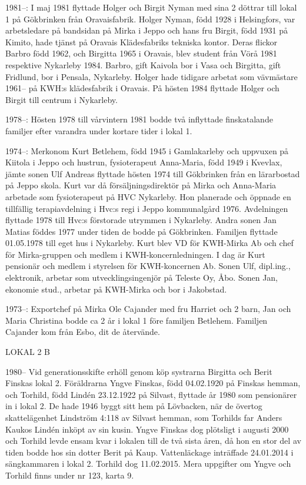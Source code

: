 1981--: I maj 1981 flyttade Holger och Birgit Nyman med sina 2 döttrar till lokal 1 på Gökbrinken från Oravaisfabrik. Holger Nyman, född 1928 i Helsingfors, var arbetsledare på bandsidan på Mirka i Jeppo och hans fru Birgit, född 1931 på Kimito, hade tjänst på Oravais Klädesfabriks tekniska kontor. Deras flickor Barbro född 1962, och Birgitta 1965 i Oravais, blev student från Vörå 1981 respektive Nykarleby 1984. Barbro, gift Kaivola bor i Vasa och Birgitta, gift Fridlund, bor i Pensala, Nykarleby. Holger hade tidigare arbetat som vävmästare 1961-- på KWH:s klädesfabrik i Oravais. På hösten 1984 flyttade Holger och Birgit till centrum i Nykarleby.

1978--: Hösten 1978 till vårvintern 1981 bodde två inflyttade finskatalande familjer efter varandra under kortare tider i lokal 1.

1974--: Merkonom Kurt Betlehem, född 1945 i Gamlakarleby och uppvuxen på Kiitola i Jeppo och hustrun, fysioterapeut Anna-Maria, född 1949 i Kvevlax, jämte sonen Ulf Andreas flyttade hösten 1974 till Gökbrinken från en lärarbostad på Jeppo skola. Kurt var då försäljningsdirektör på Mirka och Anna-Maria arbetade som fysioterapeut på HVC Nykarleby. Hon planerade och öppnade en tillfällig terapiavdelning i Hvc:s regi i Jeppo kommunalgård 1976. Avdelningen flyttade 1978 till Hvc:s förstorade utrymmen i Nykarleby. Andra sonen Jan Matias föddes 1977 under tiden de bodde på Gökbrinken.  Familjen flyttade 01.05.1978 till eget hus i Nykarleby. Kurt blev VD för KWH-Mirka Ab och chef för Mirka-gruppen och medlem i KWH-koncernledningen. I dag är Kurt pensionär och medlem i styrelsen för KWH-koncernen Ab. Sonen Ulf, dipl.ing., elektronik, arbetar som utvecklingsingenjör på Teleste Oy, Åbo. Sonen Jan, ekonomie stud., arbetar på KWH-Mirka och bor i Jakobstad.

1973--: Exportchef på Mirka Ole Cajander med fru Harriet och 2 barn, Jan och Maria Christina bodde ca 2 år i lokal 1 före familjen Betlehem. Familjen Cajander kom från Esbo, dit de återvände.


LOKAL 2 B

 1980--
Vid generationsskifte erhöll genom köp systrarna Birgitta och Berit Finskas lokal 2.  Föräldrarna Yngve Finskas, född 04.02.1920 på Finskas hemman, och Torhild, född Lindén 23.12.1922 på Silvast, flyttade år 1980 som pensionärer in i lokal 2. De hade 1946 byggt sitt hem på Lövbacken, när de övertog skattelägenhet Lindström 4:118 av Silvast hemman, som Torhilds far Anders Kaukos Lindén inköpt av sin kusin. Yngve Finskas dog plötsligt i augusti 2000 och Torhild levde ensam kvar i lokalen till de två sista åren, då hon en stor del av tiden bodde hos sin dotter Berit på Kaup. Vattenläckage inträffade 24.01.2014 i sängkammaren i lokal 2. Torhild dog 11.02.2015. Mera uppgifter om Yngve och Torhild finns under nr 123, karta 9.

